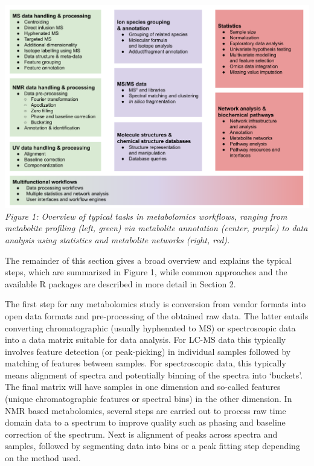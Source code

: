 \documentclass[]{article}
\begin{document}
\includegraphics{figures/Figure 1.png}
\emph{Figure 1: Overview of typical tasks in metabolomics workflows, ranging from metabolite profiling (left, green) via metabolite annotation (center, purple) to data analysis using statistics and metabolite networks (right, red).}

The remainder of this section gives a broad overview and explains the typical steps, which are summarized in Figure 1, while common approaches and the available R packages are described in more detail in Section 2.

The first step for any metabolomics study is conversion from vendor formats into open data formats and pre-processing of the obtained raw data. The latter entails converting chromatographic (usually hyphenated to MS) or spectroscopic data into a data matrix suitable for data analysis. For LC-MS data this typically involves feature detection (or peak-picking) in individual samples followed by matching of features between samples. For spectroscopic data, this typically means alignment of spectra and potentially binning of the spectra into `buckets'. The final matrix will have samples in one dimension and so-called features (unique chromatographic features or spectral bins) in the other dimension. In NMR based metabolomics, several steps are carried out to process raw time domain data to a spectrum to improve quality such as phasing and baseline correction of the spectrum. Next is alignment of peaks across spectra and samples, followed by segmenting data into bins or a peak fitting step depending on the method used.
\end{document}
